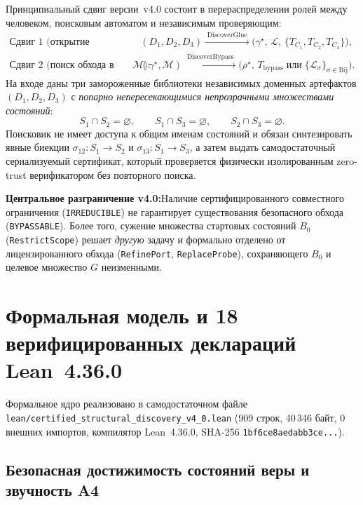 \documentclass[10pt,a4paper]{article}
\newcommand{\code}[1]{\nolinkurl{#1}}
\newcommand{\takeaway}[2]{%
  \vspace{4pt}\noindent\colorbox{primary!7}{%
    \parbox{\dimexpr\linewidth-2\fboxsep\relax}{%
      \vspace{3pt}\textbf{\color{primary}#1:}\hspace{0.4em}#2\vspace{3pt}%
    }%
  }\vspace{4pt}%
}
\begin{document}
Принципиальный сдвиг версии~v4.0 состоит в перераспределении ролей между человеком, поисковым автоматом и независимым проверяющим:
\begin{align}\label{eq:pipeline}
\text{Сдвиг 1 (открытие ограничения):}\quad &
(D_1, D_2, D_3) \xrightarrow{\;\mathrm{DiscoverGlue}\;} \bigl(\gamma^\star,\, \mathcal{L},\, \{T_{C_1}, T_{C_2}, T_{C_4}\}\bigr), \\
\text{Сдвиг 2 (поиск обхода в меню $\mathcal{M}$):}\quad &
(\gamma^\star, \mathcal{M}) \xrightarrow{\;\mathrm{DiscoverBypass}\;} \bigl(\rho^\star,\, T_{\mathrm{bypass}} \;\text{или}\; \{\mathcal{L}_\sigma\}_{\sigma \in \mathrm{Bij}}\bigr).
\end{align}
На входе даны три замороженные библиотеки независимых доменных артефактов $(D_1, D_2, D_3)$ с \emph{попарно непересекающимися непрозрачными множествами состояний}:
\[
S_1 \cap S_2 = \varnothing, \qquad S_1 \cap S_3 = \varnothing, \qquad S_2 \cap S_3 = \varnothing.
\]
Поисковик не имеет доступа к общим именам состояний и обязан синтезировать явные биекции $\sigma_{12}: S_1 \to S_2$ и $\sigma_{13}: S_1 \to S_3$, а затем выдать самодостаточный сериализуемый сертификат, который проверяется физически изолированным zero-trust верификатором без повторного поиска.

\takeaway{Центральное разграничение v4.0}{Наличие сертифицированного совместного ограничения (\code{IRREDUCIBLE}) не гарантирует существования безопасного обхода (\code{BYPASSABLE}). Более того, сужение множества стартовых состояний $B_0$ (\code{RestrictScope}) решает \emph{другую} задачу и формально отделено от лицензированного обхода (\code{RefinePort}, \code{ReplaceProbe}), сохраняющего $B_0$ и целевое множество $G$ неизменными.}

\section{Формальная модель и 18 верифицированных деклараций Lean~4.36.0}

Формальное ядро реализовано в самодостаточном файле \code{lean/certified_structural_discovery_v4_0.lean} (909 строк, 40\,346 байт, 0 внешних импортов, компилятор Lean~4.36.0, SHA-256 \code{1bf6ce8aedabb3ce...}).

\subsection{Безопасная достижимость состояний веры и звучность A4}
\end{document}
